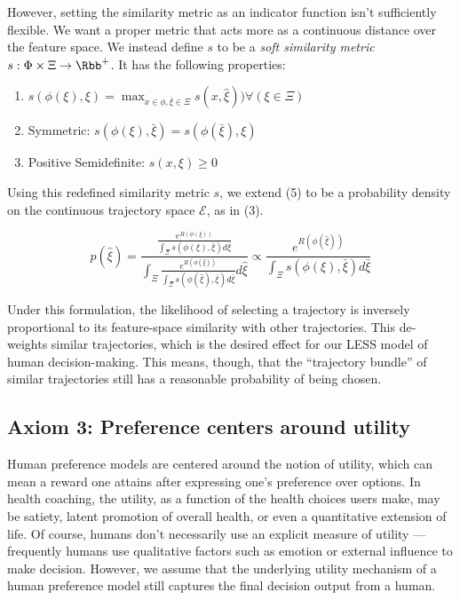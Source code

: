 \documentclass[
  letterpaper,
  DIV=11,
  numbers=noendperiod,
  oneside]{scrreprt}
\theoremstyle{remark}
\begin{document}
However, setting the similarity metric as an indicator function isn't
sufficiently flexible. We want a proper metric that acts more as a
continuous distance over the feature space. We instead define \(s\) to
be a \emph{soft similarity metric}
\(s : \Phi \times \Xi \rightarrow \Rbb^+\). It has the following
properties:

\begin{enumerate}
\def\labelenumi{\arabic{enumi}.}
\item
  \(s(\phi(\xi), \xi) = \max_{x \in \phi, \bar{\xi} \in \Xi} s(x, \hat{\xi})) \forall (\xi \in \Xi)\)
\item
  Symmetric: \(s(\phi(\xi), \bar{\xi}) = s(\phi(\bar{\xi}), \xi)\)
\item
  Positive Semidefinite: \(s(x, \xi) \geq 0\)
\end{enumerate}

Using this redefined similarity metric \(s\), we extend (5) to be a
probability density on the continuous trajectory space \(\mathcal{E}\),
as in (3).

\[p(\hat{\xi}) = \frac{\frac{e^{R(\phi(\xi))}}{\int_{\Xi} s(\phi(\xi), \bar{\xi}) d\bar{\xi}}}{\int_{\Xi}\frac{e^{R(\phi(\hat{\xi}))}}{\int_{\Xi} s(\phi(\hat{\xi}), \bar{\xi}) d\bar{\xi}}d\hat{\xi}} \propto \frac{e^{R(\phi(\hat{\xi}))}}{\int_{\Xi} s(\phi(\xi), \bar{\xi}) d\bar{\xi}}\]

Under this formulation, the likelihood of selecting a trajectory is
inversely proportional to its feature-space similarity with other
trajectories. This de-weights similar trajectories, which is the desired
effect for our LESS model of human decision-making. This means, though,
that the ``trajectory bundle'' of similar trajectories still has a
reasonable probability of being chosen.

\subsection*{Axiom 3: Preference centers around
utility}\label{axiom-3-preference-centers-around-utility}

Human preference models are centered around the notion of utility, which
can mean a reward one attains after expressing one's preference over
options. In health
coaching, the utility, as a function of the health choices users make,
may be satiety, latent promotion of overall health, or even a
quantitative extension of life. Of course, humans don't necessarily use
an explicit measure of utility --- frequently humans use qualitative
factors such as emotion or external influence to make decision. However,
we assume that the underlying utility mechanism of a human preference
model still captures the final decision output from a human.
\end{document}
